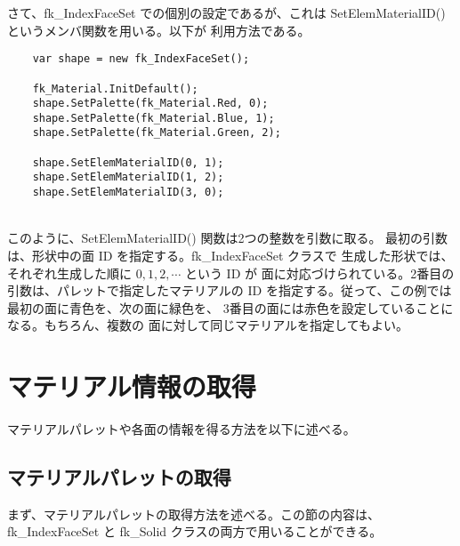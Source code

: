 さて、fk\_IndexFaceSet での個別の設定であるが、これは
SetElemMaterialID() というメンバ関数を用いる。以下が
利用方法である。
\\
\begin{breakbox}
\begin{verbatim}
    var shape = new fk_IndexFaceSet();

    fk_Material.InitDefault();
    shape.SetPalette(fk_Material.Red, 0);
    shape.SetPalette(fk_Material.Blue, 1);
    shape.SetPalette(fk_Material.Green, 2);

    shape.SetElemMaterialID(0, 1);
    shape.SetElemMaterialID(1, 2);
    shape.SetElemMaterialID(3, 0);
\end{verbatim}
\end{breakbox}
~ \\
このように、SetElemMaterialID() 関数は2つの整数を引数に取る。
最初の引数は、形状中の面 ID を指定する。fk\_IndexFaceSet クラスで
生成した形状では、それぞれ生成した順に \(0, 1, 2, \cdots\) という ID が
面に対応づけられている。2番目の引数は、パレットで指定したマテリアルの
ID を指定する。従って、この例では最初の面に青色を、次の面に緑色を、
3番目の面には赤色を設定していることになる。もちろん、複数の
面に対して同じマテリアルを指定してもよい。
\newpage
\section{マテリアル情報の取得}
マテリアルパレットや各面の情報を得る方法を以下に述べる。
\subsection{マテリアルパレットの取得}
まず、マテリアルパレットの取得方法を述べる。この節の内容は、
fk\_IndexFaceSet と fk\_Solid クラスの両方で用いることができる。

